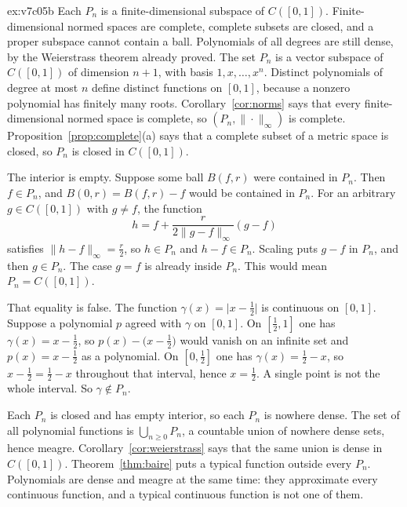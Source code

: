 \begin{solution}{ex:v7c05b}
\idea Each $P_n$ is a finite-dimensional subspace of $C([0,1])$. Finite-dimensional normed spaces are complete, complete subsets are closed, and a proper subspace cannot contain a ball. Polynomials of all degrees are still dense, by the Weierstrass theorem already proved.
\writeup The set $P_n$ is a vector subspace of $C([0,1])$ of dimension $n+1$, with basis $1,x,\dots,x^n$. Distinct polynomials of degree at most $n$ define distinct functions on $[0,1]$, because a nonzero polynomial has finitely many roots. Corollary~\ref{cor:norms} says that every finite-dimensional normed space is complete, so $(P_n,\|\cdot\|_\infty)$ is complete. Proposition~\ref{prop:complete}(a) says that a complete subset of a metric space is closed, so $P_n$ is closed in $C([0,1])$.

The interior is empty. Suppose some ball $B(f,r)$ were contained in $P_n$. Then $f\in P_n$, and $B(0,r)=B(f,r)-f$ would be contained in $P_n$. For an arbitrary $g\in C([0,1])$ with $g\ne f$, the function
\[h=f+\frac{r}{2\|g-f\|_\infty}(g-f)\]
satisfies $\|h-f\|_\infty=\frac r2$, so $h\in P_n$ and $h-f\in P_n$. Scaling puts $g-f$ in $P_n$, and then $g\in P_n$. The case $g=f$ is already inside $P_n$. This would mean $P_n=C([0,1])$.

That equality is false. The function $\gamma(x)=\bigl|x-\frac12\bigr|$ is continuous on $[0,1]$. Suppose a polynomial $p$ agreed with $\gamma$ on $[0,1]$. On $[\frac12,1]$ one has $\gamma(x)=x-\frac12$, so $p(x)-\bigl(x-\frac12\bigr)$ would vanish on an infinite set and $p(x)=x-\frac12$ as a polynomial. On $[0,\frac12]$ one has $\gamma(x)=\frac12-x$, so $x-\frac12=\frac12-x$ throughout that interval, hence $x=\frac12$. A single point is not the whole interval. So $\gamma\notin P_n$.

Each $P_n$ is closed and has empty interior, so each $P_n$ is nowhere dense. The set of all polynomial functions is $\bigcup_{n\ge0}P_n$, a countable union of nowhere dense sets, hence meagre. Corollary~\ref{cor:weierstrass} says that the same union is dense in $C([0,1])$. Theorem~\ref{thm:baire} puts a typical function outside every $P_n$. Polynomials are dense and meagre at the same time: they approximate every continuous function, and a typical continuous function is not one of them.
\end{solution}

